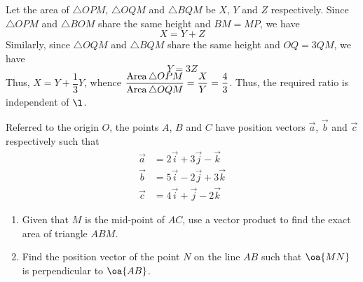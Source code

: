 \documentclass{echw}
\begin{document}
    \solution
        \begin{center}
        \end{center}

         Let the area of $\triangle OPM$, $\triangle OQM$ and $\triangle BQM$ be $X$, $Y$ and $Z$ respectively. Since $\triangle OPM$ and $\triangle BOM$ share the same height and $BM = MP$, we have
        \[
            X = Y + Z
        \]
        Similarly, since $\triangle OQM$ and $\triangle BQM$ share the same height and $OQ = 3QM$, we have
        \[
            Y = 3Z
        \]
        Thus, $X = Y + \dfrac13 Y$, whence $\dfrac{\operatorname{Area} \triangle OPM}{\operatorname{Area} \triangle OQM} = \dfrac{X}{Y} = \dfrac43$. Thus, the required ratio is independent of $\l$.

        Referred to the origin $O$, the points $A$, $B$ and $C$ have position vectors $\vec a$, $\vec b$ and $\vec c$ respectively such that
        \begin{align*}
            \vec a &= 2\vec i + 3\vec j - \vec k\\
            \vec b &= 5\vec i - 2\vec j + 3\vec k\\
            \vec c &= 4\vec i + \vec j - 2\vec k
        \end{align*}

        \begin{enumerate}
            \item Given that $M$ is the mid-point of $AC$, use a vector product to find the exact area of triangle $ABM$.
            \item Find the position vector of the point $N$ on the line $AB$ such that $\oa{MN}$ is perpendicular to $\oa{AB}$.
        \end{enumerate}
\end{document}
